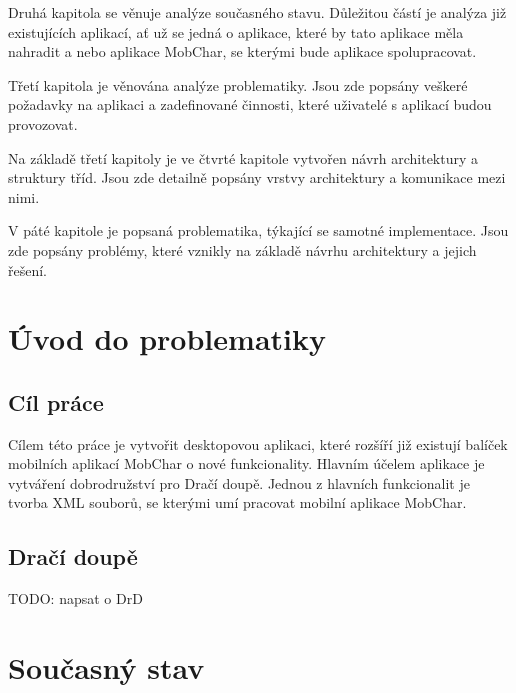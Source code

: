 \documentclass[thesis=B,czech]{resources/FITthesis}[2012/06/26]
\begin{document}
\begin{introduction}
Druhá kapitola se věnuje analýze současného stavu. Důležitou částí je analýza již existujících aplikací, ať už se jedná o aplikace, které by tato aplikace měla nahradit a nebo aplikace MobChar, se kterými bude aplikace spolupracovat.

Třetí kapitola je věnována analýze problematiky. Jsou zde popsány veškeré požadavky na aplikaci a zadefinované činnosti, které uživatelé s aplikací budou provozovat.

Na základě třetí kapitoly je ve čtvrté kapitole vytvořen návrh architektury a struktury tříd. Jsou zde detailně popsány vrstvy architektury a komunikace mezi nimi.

V páté kapitole je popsaná problematika, týkající se samotné implementace. Jsou zde popsány problémy, které vznikly na základě návrhu architektury a jejich řešení.


\end{introduction}

\chapter{Úvod do problematiky}




	\section{Cíl práce}
Cílem této práce je vytvořit desktopovou aplikaci, které rozšíří již existují balíček mobilních aplikací MobChar o nové funkcionality. Hlavním účelem aplikace je vytváření dobrodružství pro Dračí doupě. Jednou z hlavních funkcionalit je tvorba XML souborů, se kterými umí pracovat mobilní aplikace MobChar.
	\section{Dračí doupě}
		TODO: napsat o DrD



\chapter{Současný stav}
\end{document}
